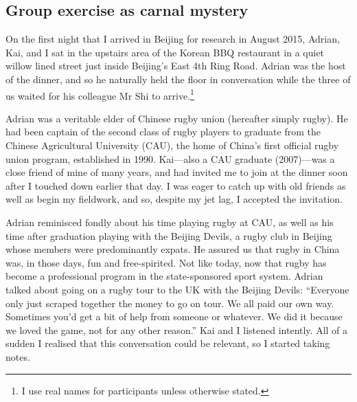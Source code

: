                                           \begin{CJK}{UTF8}{gbsn}

\section{Group exercise as carnal mystery\label{sect:adrian}}


On the first night that I arrived in Beijing for research in August 2015, Adrian, Kai, and I sat in the upstairs area of the Korean BBQ restaurant in a quiet willow lined street just inside Beijing's East 4th Ring Road.  Adrian was the host of the dinner, and so he naturally held the floor in conversation while the three of us waited for his colleague Mr Shi to arrive.\footnote{I use real names for participants unless otherwise stated.}

Adrian was a veritable elder of Chinese rugby union (hereafter simply rugby).  He had been captain of the second class of rugby players to graduate from the Chinese Agricultural University (CAU), the home of China's first official rugby union program, established in 1990.  Kai---also a CAU graduate (2007)---was a close friend of mine of many years, and had invited me to join at the dinner soon after I touched down earlier that day.  I was eager to catch up with old friends as well as begin my fieldwork, and so, despite my jet lag, I accepted the invitation.

Adrian reminisced fondly about his time playing rugby at CAU, as well as his time after graduation playing with the Beijing Devils, a rugby club in Beijing whose members were predominantly expats.  He assured us that rugby in China was, in those days, fun and free-spirited.  Not like today, now that rugby has become a professional program in the state-sponsored sport system.  Adrian talked about going on a rugby tour to the UK with the Beijing Devils:  ``Everyone only just scraped together the money to go on tour.  We all paid our own way. Sometimes you'd get a bit of help from someone or whatever. We did it because we loved the game, not for any other reason.''   Kai and I listened intently.  All of a sudden I realised that this conversation could be relevant, so I started taking notes.



\end{CJK}
